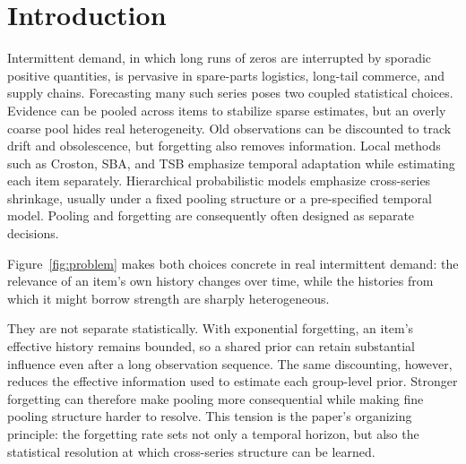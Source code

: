 \documentclass[twocolumn,10pt]{article}
\theoremstyle{definition}
\begin{document}
\section{Introduction}\label{sec:intro}

Intermittent demand, in which long runs of zeros are interrupted by
sporadic positive quantities, is pervasive in spare-parts logistics,
long-tail commerce, and supply chains. Forecasting many such series poses
two coupled statistical choices. Evidence can be pooled across items to
stabilize sparse estimates, but an overly coarse pool hides real
heterogeneity. Old observations can be discounted to track drift and
obsolescence, but forgetting also removes information. Local methods such
as Croston, SBA, and TSB
\citep{croston1972,syntetos2005accuracy,teunter2011} emphasize temporal
adaptation while estimating each item separately. Hierarchical
probabilistic models \citep{chapados2014,seeger2016,pitkin2024} emphasize
cross-series shrinkage, usually under a fixed pooling structure or a
pre-specified temporal model. Pooling and forgetting are consequently
often designed as separate decisions.

Figure~\ref{fig:problem} makes both choices concrete in real intermittent
demand: the relevance of an item's own history changes over time, while
the histories from which it might borrow strength are sharply
heterogeneous.

They are not separate statistically. With exponential forgetting, an
item's effective history remains bounded, so a shared prior can retain
substantial influence even after a long observation sequence. The same
discounting, however, reduces the effective information used to estimate
each group-level prior. Stronger forgetting can therefore make pooling
more consequential while making fine pooling structure harder to resolve.
This tension is the paper's organizing principle: the forgetting rate sets
not only a temporal horizon, but also the statistical resolution at which
cross-series structure can be learned.
\end{document}
